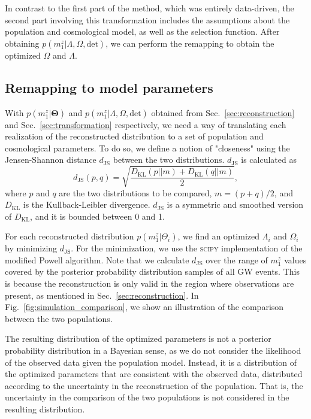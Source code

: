 \documentclass[sn-aps, pdflatex, iicol]{sn-jnl}
\begin{document}
In contrast to the first part of the method, which was entirely data-driven, the second part involving this transformation includes the assumptions about the population and cosmological model, as well as the selection function.
After obtaining $p(m^z_1|\Lambda, \Omega, \mathrm{det})$, we can perform the remapping to obtain the optimized $\Omega$ and $\Lambda$.

\subsection{Remapping to model parameters}
\label{sec:remapping}

With $p(m^z_1|\mathbf{\Theta})$ and $p(m^z_1|\Lambda, \Omega, \mathrm{det})$ obtained from Sec.~\ref{sec:reconstruction} and Sec.~\ref{sec:transformation} respectively, we need a way of translating each realization of the reconstructed distribution to a set of population and cosmological parameters.
To do so, we define a notion of "closeness" using the Jensen-Shannon distance $d_\mathrm{JS}$ between the two distributions.
$d_\mathrm{JS}$ is calculated as
\begin{equation}
    d_\mathrm{JS}(p, q) = \sqrt{\frac{D_\mathrm{KL}(p||m) + D_\mathrm{KL}(q||m)}{2}},
\end{equation}
where $p$ and $q$ are the two distributions to be compared, $m = (p + q) / 2$, and $D_\mathrm{KL}$ is the Kullback-Leibler divergence.
$d_\mathrm{JS}$ is a symmetric and smoothed version of $D_\mathrm{KL}$, and it is bounded between 0 and 1.

For each reconstructed distribution $p(m^z_1|\Theta_i)$, we find an optimized $\Lambda_i$ and $\Omega_i$ by minimizing $d_\mathrm{JS}$.
For the minimization, we use the \textsc{scipy} \citep{2020SciPy-NMeth} implementation of the modified Powell algorithm.
Note that we calculate $d_\mathrm{JS}$ over the range of $m^z_1$ values covered by the posterior probability distribution samples of all \ac{GW} events.
This is because the reconstruction is only valid in the region where observations are present, as mentioned in Sec.~\ref{sec:reconstruction}.
In Fig.~\ref{fig:simulation_comparison}, we show an illustration of the comparison between the two populations.

The resulting distribution of the optimized parameters is not a posterior probability distribution in a Bayesian sense, as we do not consider the likelihood of the observed data given the population model.
Instead, it is a distribution of the optimized parameters that are consistent with the observed data, distributed according to the uncertainty in the reconstruction of the population.
That is, the uncertainty in the comparison of the two populations is not considered in the resulting distribution.
\end{document}
